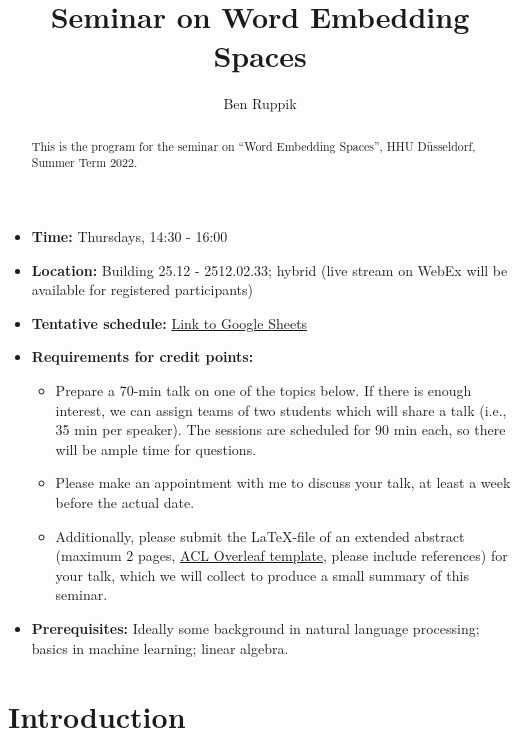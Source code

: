 \documentclass[11pt, a4paper]{amsart}
\title{Seminar on Word Embedding Spaces}
\author{Ben Ruppik}
\begin{document}
\begin{abstract}
    This is the program for the seminar on ``Word Embedding Spaces'', HHU D{\"u}sseldorf, Summer Term 2022.
\end{abstract}

\maketitle

\begin{itemize}
    \item \textbf{Time:} Thursdays, 14:30 - 16:00
    \item \textbf{Location:} Building 25.12 - 2512.02.33;
    hybrid (live stream on WebEx will be available for registered participants)
    \item \textbf{Tentative schedule:}
    \href{https://docs.google.com/spreadsheets/d/1s-pxSBL0pK5RN5ny5IiSsXUL9i8nQM7iIx_j_euDf08/edit?usp=sharing}{Link to Google Sheets}
    \item \textbf{Requirements for credit points:}
    \begin{itemize}
        \item Prepare a 70-min talk on one of the topics below.
        If there is enough interest, we can assign teams of two students which will share a talk (i.e., 35 min per speaker).
        The sessions are scheduled for 90 min each, so there will be ample time for questions.
        \item Please make an appointment with me to discuss your talk, at least a week before the actual date.
        \item Additionally, please submit the \LaTeX-file of an extended abstract (maximum 2 pages, \href{https://www.overleaf.com/latex/templates/acl-2020-proceedings-template/zsrkcwjptpcd}{ACL Overleaf template}, please include references) for your talk, which we will collect to produce a small summary of this seminar.
    \end{itemize}
    \item \textbf{Prerequisites:}
    Ideally some background in natural language processing; basics in machine learning; linear algebra.
\end{itemize}

\clearpage
\section{Introduction}
\label{sec:intro}
\end{document}
